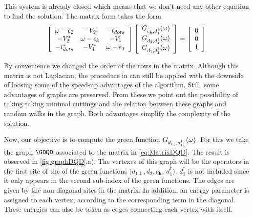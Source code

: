 \documentclass[showpacs,aps,prb,reprint,superscriptaddress]{revtex4-1}
\begin{document}
 This system is already closed which means that we don't need any other equation to find the solution. The matrix form takes the form
 \begin{equation}
\left[\begin{array}{ccc}
\omega-\epsilon_{2} & -V_{2} & -t_{dots}\\
-V_{2}^{*} & \omega-\epsilon_{k} & -V_{1}\\
-t_{dots}^{*} & -V_{1}^{*} & \omega-\epsilon_{1}
\end{array}\right]\left[\begin{array}{c}
G_{c_{\mathbf{k}},d_{1}^{\dagger}}(\omega)\\
G_{d_2,d_{1}^{\dagger}}(\omega)\\
G_{d_{1},d_{1}^{\dagger}}(\omega)
\end{array}\right]=\left[\begin{array}{c}
0\\
0\\
1
\end{array}\right]
\label{eq:MatrixDQD}
 \end{equation}
 
\noindent By convenience we changed the order of the rows in the matrix. Although this matrix is not Laplacian, the procedure in \cite{spielman10} can still be applied with the downside of loosing some of the speed-up advantages of the algorithm. Still, some advantages of graphs are preserved. From these we point out  the possibility of taking taking minimal cuttings and the relation between these graphs and random walks in the graph. Both advantages simplify the complexity of the solution. 
 
Now, our objective is to compute the green function  $G_{d_{1\downarrow},d_{1\downarrow}^{\dagger}}(\omega)$.   For this we take the graph $\GDQD$ associated to the matrix in \eqref{eq:MatrixDQD}. The result is observed in \ref{fig:graphDQD}.a).  The vertexes of this graph will be the operators in the first site of the of the green functions  $(d_{1\downarrow},d_{2},c_{\boldsymbol{k}}$. $d_1^\dagger)$. $d^\dagger_1$ is not included since it only appears in the second sub-index of the green functions. The edges are given by the non-diagonal sites in the matrix. In addition, an energy parameter is assigned to each vertex, according to the corresponding term in the diagonal. These energies can also be taken as edges connecting each vertex with itself. 
\end{document}
